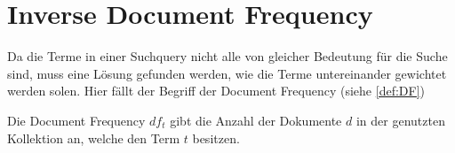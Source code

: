\section{Inverse Document Frequency}
Da die Terme in einer Suchquery nicht alle von gleicher Bedeutung für die Suche sind, muss eine Lösung gefunden werden, wie die Terme untereinander gewichtet werden solen. Hier fällt der Begriff der Document Frequency (siehe \cref{def:DF})

\begin{defi}\label{def:DF}
	Die Document Frequency $df_t$ gibt die Anzahl der Dokumente $d$ in der genutzten Kollektion an, welche den Term $t$ besitzen.
\end{defi}